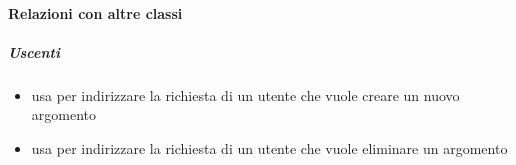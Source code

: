\paragraph{Relazioni con altre classi}
\subparagraph{Uscenti}
\begin{itemize}
\item usa  per indirizzare la richiesta di un utente che vuole creare un nuovo argomento
\item usa  per indirizzare la richiesta di un utente che vuole eliminare un argomento
\end{itemize}
